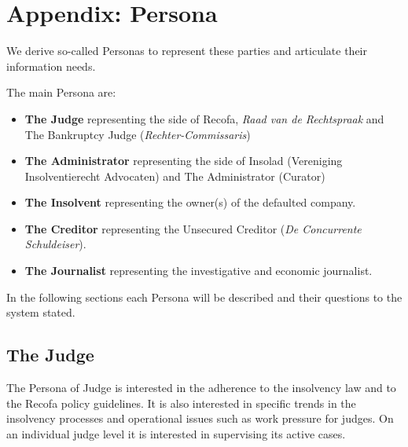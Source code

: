 \section{Appendix: Persona}
We derive so-called Personas to represent these parties and articulate their information needs.

The main Persona are: 
\begin{itemize}
\item \textbf{The Judge} representing the side of Recofa, \textit{Raad van de Rechtspraak} and The Bankruptcy Judge (\textit{Rechter-Commissaris})
\item \textbf{The Administrator} representing the side of Insolad (Vereniging Insolventierecht Advocaten) and The Administrator (Curator) 
\item \textbf{The Insolvent} representing the owner(s) of the defaulted company.
\item \textbf{The Creditor} representing the Unsecured Creditor (\textit{De Concurrente Schuldeiser}).
\item \textbf{The Journalist} representing the investigative and economic journalist.
\end{itemize}

In the following sections each Persona will be described and their questions to the system stated.

\subsection{The Judge}
The Persona of Judge is interested in the adherence to the insolvency law and to the Recofa policy guidelines. It is also interested in specific trends in the insolvency processes and operational issues such as work pressure for judges. On an individual judge level it is interested in supervising its active cases.

